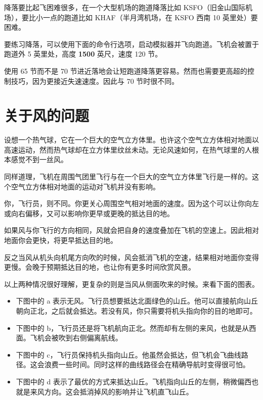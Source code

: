 \begin{itemize}
降落要比起飞困难很多，在一个大型机场的跑道降落比如 KSFO（旧金山国际机场），要比小一点的跑道比如 KHAF（半月湾机场，在 KSFO 西南 10 英里处）要困难。

要练习降落，可以使用下面的命令行选项，启动模拟器并飞向跑道。飞机会被置于跑道外 5 英里处，高度 \textbf{1500} 英尺，速度 120 节。


使用 65 节而不是 70 节进近落地会让短跑道降落更容易。然而也需要更高超的控制技巧，因为更接近失速速度。因此与 70 节时很不同。

\section{关于风的问题}
\label{sec:Fwsw}

设想一个热气球，它在一个巨大的空气立方体里。也许这个空气立方体相对地面以高速运动，然而热气球却在立方体里纹丝未动。无论风速如何，在热气球里的人根本感觉不到一丝风。

同样道理，飞机在周围气团里飞行与在一个巨大的空气立方体里飞行是一样的。这个空气立方体相对地面的运动对飞机并没有影响。

你，飞行员，则不同。你更关心周围空气相对地面的速度。因为这个可以让你向左或向右偏移，又可以影响你更早或更晚的抵达目的地。

如果风与你飞行的方向相同，风就会把自身的速度叠加在飞机的空速上。因此相对地面你会更快，将更早抵达目的地。

反之当风从机头向机尾方向吹的时候，风会抵消飞机的空速，结果相对地面你变得更慢。会晚于预期抵达目的地，也让你有更多时间欣赏风景。

以上两种情况很好理解，更复杂的则是当风从侧面吹来的时候。来看下面的图表。

\begin{itemize}
    \item 下图中的 a 表示无风。飞行员想要抵达北面绿色的山丘。他可以直接航向山丘朝向正北，之后就会抵达。若没有风，你只需要将机头指向你的目的地即可。
    \item 下图中的 b，飞行员还是将飞机航向正北。然而却有左侧的来风，也就是从西面。飞机会被吹到右侧偏离航线。
    \item 下图中的 c，飞行员保持机头指向山丘。他虽然会抵达，但飞机会飞曲线路径。这会浪费一些时间。同时这样的曲线路径会在精确导航时变得很可怕。
    \item 下图中的 d 表示了最优的方式来抵达山丘。飞机指向山丘的左侧，稍微偏西也就是来风方向。这会抵消掉风的影响并让飞机直飞山丘。
\end{itemize}


\end{itemize}
